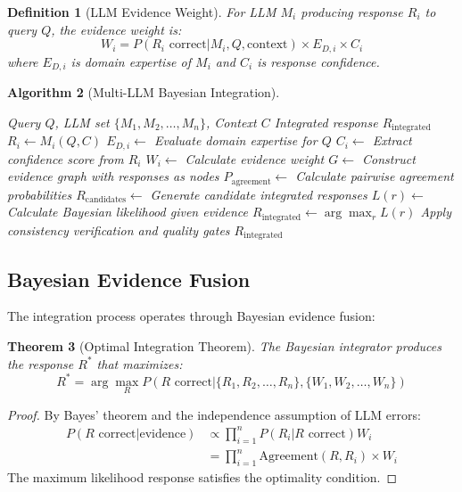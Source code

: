 \documentclass[12pt,a4paper]{article}
\newtheorem{theorem}{Theorem}[section]
\newtheorem{definition}[theorem]{Definition}
\newtheorem{algorithm}[theorem]{Algorithm}
\begin{document}
\begin{definition}[LLM Evidence Weight]
For LLM $M_i$ producing response $R_i$ to query $Q$, the evidence weight is:
\begin{equation}
W_i = P(R_i \text{ correct} | M_i, Q, \text{context}) \times E_{D,i} \times C_i
\end{equation}
where $E_{D,i}$ is domain expertise of $M_i$ and $C_i$ is response confidence.
\end{definition}

\begin{algorithm}[Multi-LLM Bayesian Integration]
\begin{algorithmic}[1]
\REQUIRE Query $Q$, LLM set $\{M_1, M_2, \ldots, M_n\}$, Context $C$
\ENSURE Integrated response $R_{\text{integrated}}$
    \STATE $R_i \leftarrow M_i(Q, C)$
    \STATE $E_{D,i} \leftarrow$ Evaluate domain expertise for $Q$
    \STATE $C_i \leftarrow$ Extract confidence score from $R_i$
    \STATE $W_i \leftarrow$ Calculate evidence weight
\ENDFOR
\STATE $G \leftarrow$ Construct evidence graph with responses as nodes
\STATE $P_{\text{agreement}} \leftarrow$ Calculate pairwise agreement probabilities
\STATE $R_{\text{candidates}} \leftarrow$ Generate candidate integrated responses
    \STATE $L(r) \leftarrow$ Calculate Bayesian likelihood given evidence
\ENDFOR
\STATE $R_{\text{integrated}} \leftarrow \arg\max_r L(r)$
\STATE Apply consistency verification and quality gates
\RETURN $R_{\text{integrated}}$
\end{algorithmic}
\end{algorithm}

\subsection{Bayesian Evidence Fusion}

The integration process operates through Bayesian evidence fusion:

\begin{theorem}[Optimal Integration Theorem]
The Bayesian integrator produces the response $R^*$ that maximizes:
\begin{equation}
R^* = \arg\max_R P(R \text{ correct} | \{R_1, R_2, \ldots, R_n\}, \{W_1, W_2, \ldots, W_n\})
\end{equation}
\end{theorem}

\begin{proof}
By Bayes' theorem and the independence assumption of LLM errors:
\begin{align}
P(R \text{ correct} | \text{evidence}) &\propto \prod_{i=1}^n P(R_i | R \text{ correct}) W_i \\
&= \prod_{i=1}^n \text{Agreement}(R, R_i) \times W_i
\end{align}
The maximum likelihood response satisfies the optimality condition.
\end{proof}
\end{document}
